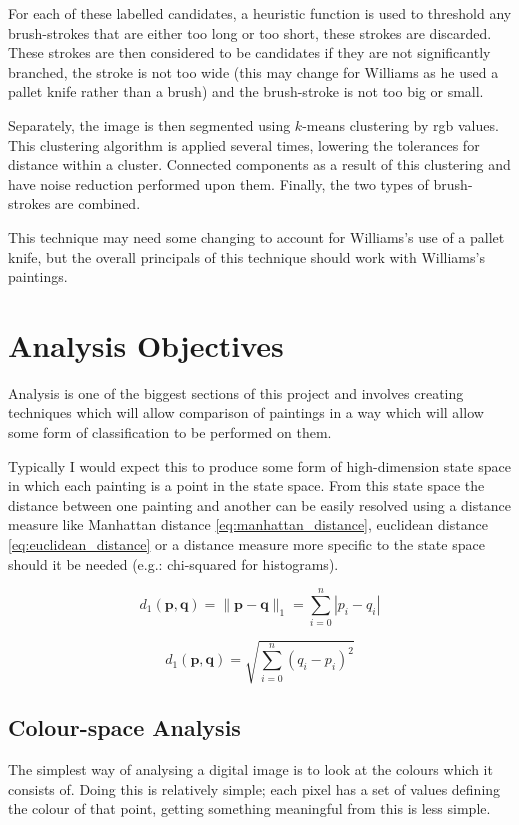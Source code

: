 For each of these labelled candidates, a heuristic function is used to threshold any brush-strokes 
that are either too long or too short, these strokes are discarded. These strokes are then
considered to be candidates if they are not significantly branched, the stroke is not too wide 
(this may change for Williams as he used a pallet knife rather than a brush) and the 
brush-stroke is not too big or small.

Separately, the image is then segmented using $k$-means clustering by \gls{rgb} values. This clustering 
algorithm is applied several times, lowering the tolerances for distance within a cluster. 
Connected components as a result of this clustering and have noise reduction performed upon them.
Finally, the two types of brush-strokes are combined.

This technique may need some changing to account for Williams's use of a pallet knife, but
the overall principals of this technique should work with Williams's paintings.


\section{Analysis Objectives}
Analysis is one of the biggest sections of this project and involves creating techniques which 
will allow comparison of paintings in a way which will allow some form of classification to be
performed on them.

Typically I would expect this to produce some form of high-dimension state space in which each
painting is a point in the state space. From this state space the distance between one painting
and another can be easily resolved using a distance measure like Manhattan distance 
\eqref{eq:manhattan_distance}, euclidean distance \eqref{eq:euclidean_distance} or a distance 
measure more specific to the state space should it be needed (e.g.: chi-squared for histograms).

\begin{equation}\label{eq:manhattan_distance}
d_1(\mathbf{p},\mathbf{q}) = \|\mathbf{p}-\mathbf{q}\|_1 = \sum^{n}_{i=0}{|p_i-q_i|}
\end{equation}

\begin{equation}\label{eq:euclidean_distance}
d_1(\mathbf{p}, \mathbf{q}) = \sqrt{\sum^{n}_{i=0}({q_i-p_i})^2}
\end{equation}

\subsection{Colour-space Analysis}
The simplest way of analysing a digital image is to look at the colours which it consists of.
Doing this is relatively simple; each pixel has a set of values defining the colour of that point,
getting something meaningful from this is less simple.

